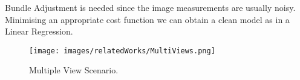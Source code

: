 Bundle Adjustment is needed since the image measurements are usually noisy. Minimising an appropriate cost function we can obtain a clean model as in a Linear Regression.
\begin{figure}
    \centering
    \texttt{[image: images/relatedWorks/MultiViews.png]} %
    \caption{Multiple View Scenario. }
    \label{fig:multiview}
\end{figure}


